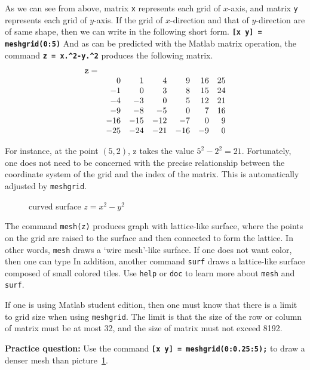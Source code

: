\vn As we can see from above, matrix {\tt x} represents each grid of $x$-axis, and matrix {\tt y} represents each grid of $y$-axis. If the grid of $x$-direction and that of $y$-direction are of same shape, then we can write in the following short form. \matlabp\texttt{\textbf{[x y] = meshgrid(0:5)}} \vn And as can be predicted with the Matlab matrix operation, the command \texttt{\textbf{z = x.\^{}2-y.\^{}2}} produces the following matrix.
$$\begin{array}{rrrrrrr}
{\tt z =} & & & & & & \\
& 0  &  1  &  4  &  9  &  16  &  25 \\
& -1  &  0  &  3  &  8  &  15  &  24 \\
& -4  &  -3  &  0  &  5  &  12  &  21 \\
& -9  &  -8  &  -5  &  0  &  7  &  16 \\
& -16  &  -15  &  -12  &  -7  &  0  &  9 \\
& -25  &  -24  &  -21  &  -16  &  -9  &  0
\end{array}$$

\vn For instance, at the point $(5, 2)$, z takes the value $5^{2}-2^{2} = 21$. Fortunately, one does not need to be concerned with the precise relationship between the coordinate system of the grid and the index of the matrix. This is automatically adjusted by {\tt meshgrid}.

\begin{figure}[]
\center {} \caption{curved surface $z = x^{2}-y^{2}$} \label{surf}
\end{figure}

\vv The command {\tt mesh(z)} produces graph with lattice-like surface, where the points on the grid are raised to the surface and then connected to form the lattice. In other words, {\tt mesh} draws a `wire mesh'-like surface. If one does not want color, then one can type  \vn In addition, another command {\tt surf} draws a lattice-like surface composed of small colored tiles. Use {\tt help} or {\tt doc} to learn more about {\tt mesh} and {\tt surf}.

If one is using Matlab student edition, then one must know that there is a limit to grid size when using {\tt meshgrid}. The limit is that the size of the row or column of matrix must be at most 32, and the size of matrix must not exceed 8192.

\vn \textbf{Practice question:} Use the command  \vv \texttt{\textbf{[x y] = meshgrid(0:0.25:5);}} \vn to draw a denser mesh than picture~\ref{surf}.

